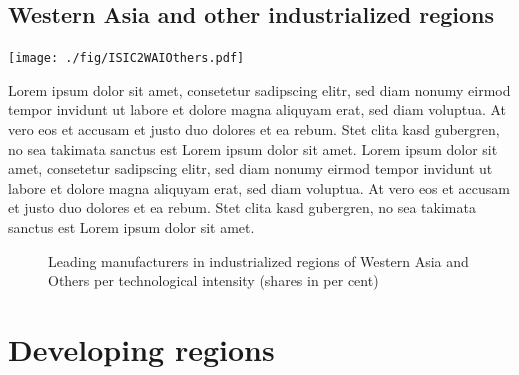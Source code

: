 \documentclass[
  openany, nofonts]{tufte-book}
\begin{document}
\hypertarget{western-asia-and-other-industrialized-regions}{%
\subsection{Western Asia and other industrialized regions}\label{western-asia-and-other-industrialized-regions}}

\begin{marginfigure}
\texttt{[image: ./fig/ISIC2WAIOthers.pdf]} \end{marginfigure}

Lorem ipsum dolor sit amet, consetetur sadipscing elitr, sed diam nonumy eirmod tempor invidunt ut labore et dolore magna aliquyam erat, sed diam voluptua. At vero eos et accusam et justo duo dolores et ea rebum. Stet clita kasd gubergren, no sea takimata sanctus est Lorem ipsum dolor sit amet. Lorem ipsum dolor sit amet, consetetur sadipscing elitr, sed diam nonumy eirmod tempor invidunt ut labore et dolore magna aliquyam erat, sed diam voluptua. At vero eos et accusam et justo duo dolores et ea rebum. Stet clita kasd gubergren, no sea takimata sanctus est Lorem ipsum dolor sit amet.

\vspace*{\fill}

\begin{figure}
\newline{}\caption[Leading manufacturers in industrialized regions of Western Asia and Others per technological intensity (shares in per cent)]{Leading manufacturers in industrialized regions of Western Asia and Others per technological intensity (shares in per cent)}\label{fig:c05-indshareINDsub2slope}
\end{figure}

\clearpage\pagebreak

\hypertarget{developing-regions}{%
\section{Developing regions}\label{developing-regions}}

~
\end{document}
